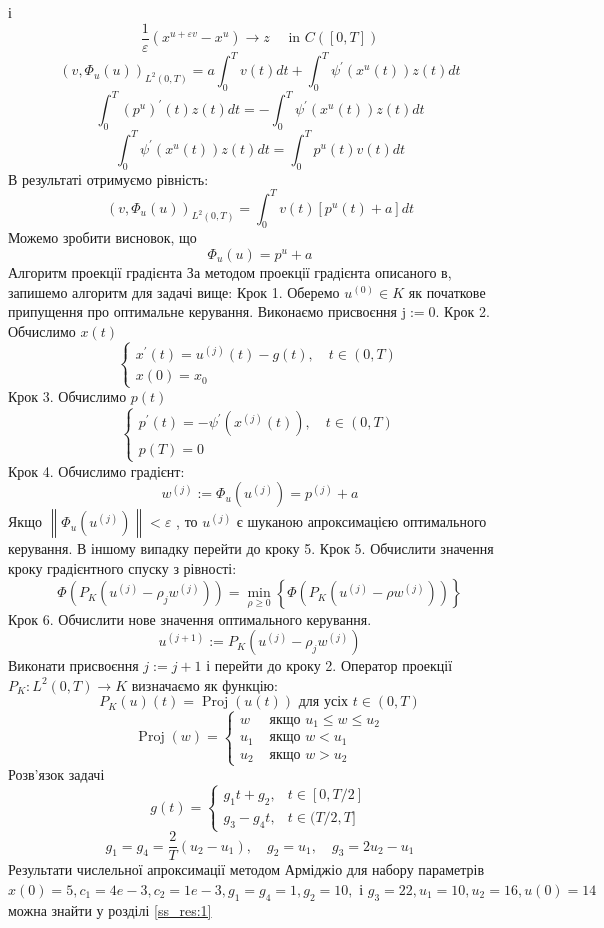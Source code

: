 \documentclass[a4paper,12pt]{extreport}
\begin{document}
і 
$$
\frac{1}{\varepsilon}\left(x^{u+\varepsilon v}-x^u\right) \longrightarrow z \quad \text { in } C([0, T])
$$
$$
\left(v, \Phi_u(u)\right)_{L^2(0, T)}=a \int_0^T v(t) d t+\int_0^T \psi^{\prime}\left(x^u(t)\right) z(t) d t
$$
$$
\int_0^T\left(p^u\right)^{\prime}(t) z(t) d t=-\int_0^T \psi^{\prime}\left(x^u(t)\right) z(t) d t
$$
$$
\int_0^T \psi^{\prime}\left(x^u(t)\right) z(t) d t=\int_0^T p^u(t) v(t) d t
$$
В результаті отримуємо рівність:
$$
\left(v, \Phi_u(u)\right)_{L^2(0, T)}=\int_0^T v(t)\left[p^u(t)+a\right] d t
$$
Можемо зробити висновок, що 
$$
\Phi_u(u)=p^u+a
$$
Алгоритм проекції градієнта
За методом проекції градієнта описаного в, запишемо алгоритм для задачі вище:
Крок 1. Оберемо $u^{(0)} \in K$ як початкове припущення про оптимальне керування. Виконаємо присвоєння $\mathrm{j}:=0$.
Крок 2. Обчислимо $x(t)$
$$
\left\{\begin{array}{l}
x^{\prime}(t)=u^{(j)}(t)-g(t), \quad t \in(0, T) \\
x(0)=x_0
\end{array}\right.
$$
Крок 3. Обчислимо $p(t)$
$$
\left\{\begin{array}{l}
p^{\prime}(t)=-\psi^{\prime}\left(x^{(j)}(t)\right), \quad t \in(0, T) \\
p(T)=0
\end{array}\right.
$$
Крок 4. Обчислимо градієнт:
$$
w^{(j)}:=\Phi_u\left(u^{(j)}\right)=p^{(j)}+a
$$
Якщо $\left\|\Phi_u\left(u^{(j)}\right)\right\|<\varepsilon$ , то $u^{(j)}$ є шуканою апроксимацією оптимального керування. 
В іншому випадку перейти до кроку 5.
Крок 5. Обчислити значення кроку градієнтного спуску з рівності:
$$
\Phi\left(P_K\left(u^{(j)}-\rho_j w^{(j)}\right)\right)=\min _{\rho \geq 0}\left\{\Phi\left(P_K\left(u^{(j)}-\rho w^{(j)}\right)\right)\right\}
$$
Крок 6. Обчислити нове значення оптимального керування.
$$
u^{(j+1)}:=P_K\left(u^{(j)}-\rho_j w^{(j)}\right)
$$
Виконати присвоєння $j:=j+1$ і перейти до кроку 2.
Оператор проекції $P_K: L^2(0, T) \rightarrow K$ визначаємо як функцію:
$$
P_K(u)(t)=\operatorname{Proj}(u(t)) \text { для усіх } t \in(0, T)
$$
$$
\operatorname{Proj}(w)= \begin{cases}w & \text { якщо } u_1 \leq w \leq u_2 \\ u_1 & \text { якщо } w<u_1 \\ u_2 & \text { якщо } w>u_2\end{cases}
$$
Розв'язок задачі
$$
g(t)= \begin{cases}g_1 t+g_2, & t \in[0, T / 2] \\ g_3-g_4 t, & t \in(T / 2, T]\end{cases}
$$
$$
g_1=g_4=\frac{2}{T}\left(u_2-u_1\right), \quad g_2=u_1, \quad g_3=2 u_2-u_1
$$
Результати числельної апроксимації методом Арміджіо для набору параметрів $
x(0)=5, c_1=4 e-3, c_2=1 e-3, g_1=g_4=1, g_2=10, \text { і } g_3=22, u_1=10, u_2=16, u(0)=14
$
можна знайти у розділі \ref{ss_res:1}
\end{document}
